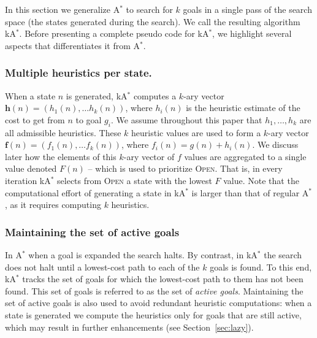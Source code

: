 \documentclass{aicom2e}
\newcommand{\astar}{A$^*$}
\newcommand{\kastar}{kA$^*$}
\newcommand{\open}{\textsc{Open}}
\begin{document}
In this section we generalize \astar{} to search for $k$ goals in a single pass of the search space (the states generated during the search). We
call the resulting algorithm \kastar{}. Before presenting a complete pseudo
code for \kastar{}, we highlight several aspects that differentiates it from \astar{}.

\subsubsection*{Multiple heuristics per state.}


When a state $n$ is generated, \kastar{} computes a $k$-ary vector
$\textbf{h}(n)=(h_1(n),\ldots h_k(n))$, where $h_i(n)$ is the heuristic
estimate of the cost to get from $n$ to goal $g_i$.
We assume throughout this paper that $h_1,\ldots,h_k$ are all admissible heuristics.
These $k$ heuristic values
are used to form a $k$-ary vector $\textbf{f}(n)=(f_1(n),\ldots f_k(n))$, where
$f_i(n)=g(n)+h_i(n)$. We discuss later how the elements of this $k$-ary vector
of $f$ values are aggregated to a single value denoted $F(n)$ -- which is used
to prioritize
\open. That is, in every iteration \kastar{} selects from \open{} a state with
the lowest $F$ value. Note that the computational effort of generating a state
in \kastar{} is larger than that of regular \astar{}, as it requires computing
$k$ heuristics.


\subsubsection*{Maintaining the set of active goals}

In \astar{} when a goal is expanded the search halts. By contrast, in \kastar{}
the search does not halt until a lowest-cost path to each of the $k$ goals is
found. To this end, \kastar{} tracks the set of goals for which the lowest-cost
path to them has not been found. This set of goals is referred to as the set of {\em
active goals}. Maintaining the set of active goals is also used to avoid
redundant heuristic computations: when a state is generated we compute the
heuristics only for goals that are still active, which may result in further enhancements (see Section~\ref{sec:lazy}).
\end{document}
